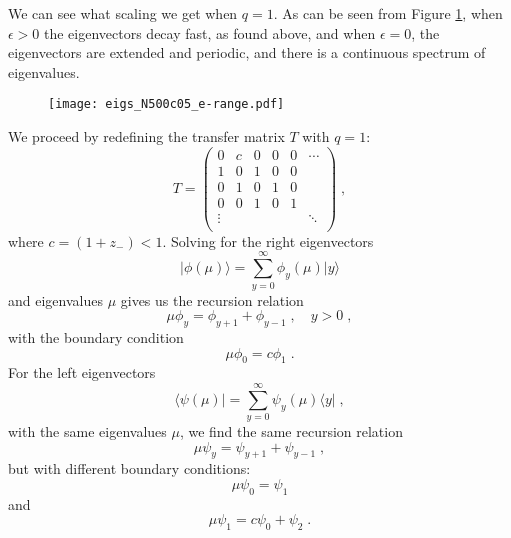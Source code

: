 \documentclass[a4paper,10pt]{article}
\newcommand{\bra}[1]{\langle #1 \vert}
\newcommand{\ket}[1]{\vert #1 \rangle}
\begin{document}
We can see what scaling we get when $q=1$. As can be seen from Figure \ref{fig:evects-epsilon}, when $\epsilon > 0$ the eigenvectors decay fast, as found above, and when $\epsilon =0$, the eigenvectors are extended and periodic, and there is a continuous spectrum of eigenvalues.
\begin{figure}
  \centering
  \texttt{[image: eigs\_N500c05\_e-range.pdf]}
  \label{fig:evects-epsilon}
\end{figure}

We proceed by redefining the transfer matrix $T$ with $q=1$:
\begin{equation}
  T = \begin{pmatrix}
       0 & c & 0 & 0 & 0 & \cdots \\
       1 & 0 & 1 & 0 & 0 &        \\
       0 & 1 & 0 & 1 & 0 &        \\
       0 & 0 & 1 & 0 & 1 &        \\
       \vdots &  &  &  &  & \ddots \\
      \end{pmatrix} \;,
\end{equation}
where $c=(1+z_-) <1$. Solving for the right eigenvectors 
\begin{equation}
  \ket{\phi(\mu)} = \sum_{y=0}^\infty \phi_y(\mu) \ket{y}
\end{equation}
and eigenvalues $\mu$ gives us the recursion relation
\begin{equation}
  \mu\phi_y = \phi_{y+1} + \phi_{y-1} \;, \quad y>0 \;,
\end{equation}
with the boundary condition
\begin{equation}
  \mu\phi_0 = c\phi_1 \;.
\end{equation}
For the left eigenvectors
\begin{equation}
  \bra{\psi(\mu)} = \sum_{y=0}^\infty \psi_y(\mu) \bra{y} \;,
\end{equation}
with the same eigenvalues $\mu$, we find the same recursion relation
\begin{equation}
  \mu \psi_y = \psi_{y+1} + \psi_{y-1} \;,
\end{equation}
but with different boundary conditions:
\begin{equation}
  \mu \psi_0 = \psi_1 
\end{equation}
and
\begin{equation}
  \mu \psi_1 = c \psi_0 + \psi_2 \;.
\end{equation}
\end{document}
